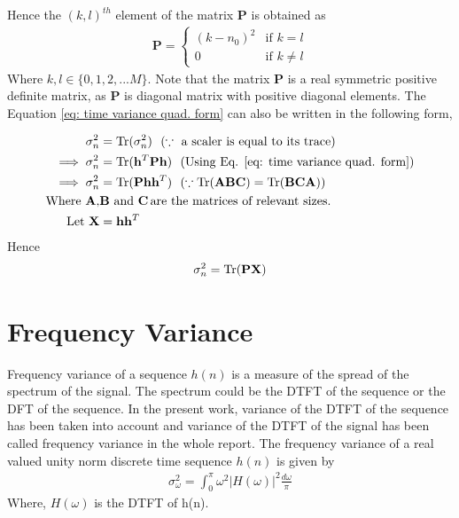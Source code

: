 Hence the $(k,l)^{th}$ element of the matrix $\mathbf{P}$ is obtained as
\begin{eqnarray}
\mathbf{P} = \begin{cases}
(k-n_0)^2 & \text{if}\,\, k = l\\
0         & \text{if}\,\, k\neq l
\end{cases}
\end{eqnarray}
Where ${k,l} \in \{0,1,2,...M \}$. Note that the matrix $\mathbf{P}$ is a real symmetric positive definite matrix, as $\mathbf{P}$ is diagonal matrix with positive diagonal elements. The Equation \ref{eq: time variance quad. form} can also be written in the following form,

\begin{eqnarray*}
\begin{aligned}
\sigma_n^2 &= \trace(\sigma_n^2) \, \, \,\, (\because \text{ a scaler is equal to its trace)} %
\\ \implies \sigma_n^2 &= \trace(\mathbf{h}^T\mathbf{Ph})\,\,\,\, (\text{Using Eq. \ref{eq: time variance quad. form}}) 
\\	 \implies \sigma_n^2  &= \trace(\mathbf{Ph}\mathbf{h}^T)\,\,\,\, (\because \trace(\mathbf{ABC})=\trace(\mathbf{BCA})) %
\\ \text{Where}\,\, \mathbf{A},&\mathbf{B}\,\, \text{and} \,\, \mathbf{C} \, \text{are the matrices of relevant sizes.}
\\ \text{Let}\,\, \mathbf{X} &= \mathbf{h}{\mathbf{h}^T}
\end{aligned}
\end{eqnarray*}
Hence 
\begin{eqnarray}
\label{eq: time variance in trace form}
\sigma_n^2 = \operatorname{Tr}(\mathbf{PX})
\end{eqnarray}

\section{Frequency Variance}
\label{sec: freq. var.}
Frequency variance of a sequence $h(n)$ is a measure of the spread of the spectrum of the signal. The spectrum could be the DTFT of the sequence or the DFT of the sequence. In the present work, variance of the DTFT of the sequence has been taken into account and variance of the DTFT of the signal has been called frequency variance in the whole report. The frequency variance of a real valued unity norm discrete time sequence $h(n)$ is given by
\begin{eqnarray}
\sigma_{\omega}^{2}=\int_{0}^{\pi}\omega^{2}|H(\omega)|^{2}\frac{d\omega}{\pi}\label{eq:Frequency variance}
\end{eqnarray}
Where, $H(\omega)$ is the DTFT of h(n).

